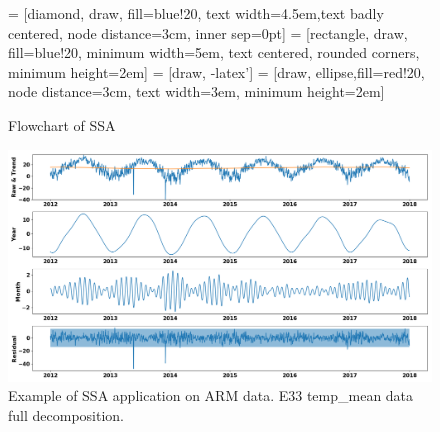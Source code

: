 \documentclass[letterpaper, 10 pt, conference]{ieeeconf}  %
\begin{document}
\begin{figure}[ht]
    \centering
     = [diamond, draw, fill=blue!20, text width=4.5em,text badly centered, node distance=3cm, inner sep=0pt]
     = [rectangle, draw, fill=blue!20, minimum width=5em, text centered, rounded corners, minimum height=2em]
     = [draw, -latex']
     = [draw, ellipse,fill=red!20, node distance=3cm, text width=3em, minimum height=2em]
    \caption{Flowchart of SSA}
    \label{fig:pcs}
\end{figure}

\begin{figure}[ht]
    \centering
    \includegraphics[width=\textwidth]{E33.png}
    \caption{Example of SSA application on ARM data. E33 temp\_mean data full 
    decomposition.}
    \label{fig:ssa}
\end{figure}
\end{document}
